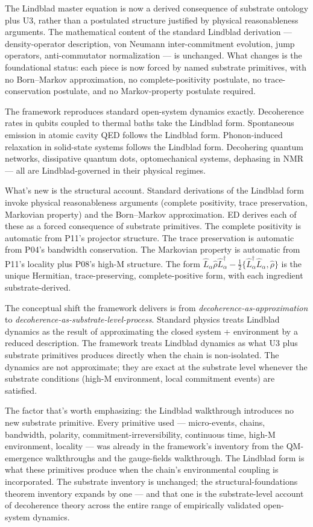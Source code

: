 \documentclass[11pt,a4paper]{article}
\begin{document}
The Lindblad master equation is now a derived consequence of substrate ontology plus U3, rather than a postulated structure justified by physical reasonableness arguments. The mathematical content of the standard Lindblad derivation --- density-operator description, von Neumann inter-commitment evolution, jump operators, anti-commutator normalization --- is unchanged. What changes is the foundational status: each piece is now forced by named substrate primitives, with no Born--Markov approximation, no complete-positivity postulate, no trace-conservation postulate, and no Markov-property postulate required.

The framework reproduces standard open-system dynamics exactly. Decoherence rates in qubits coupled to thermal baths take the Lindblad form. Spontaneous emission in atomic cavity QED follows the Lindblad form. Phonon-induced relaxation in solid-state systems follows the Lindblad form. Decohering quantum networks, dissipative quantum dots, optomechanical systems, dephasing in NMR --- all are Lindblad-governed in their physical regimes.

What's new is the structural account. Standard derivations of the Lindblad form invoke physical reasonableness arguments (complete positivity, trace preservation, Markovian property) and the Born--Markov approximation. ED derives each of these as a forced consequence of substrate primitives. The complete positivity is automatic from P11's projector structure. The trace preservation is automatic from P04's bandwidth conservation. The Markovian property is automatic from P11's locality plus P08's high-M structure. The form $\hat L_\alpha\hat\rho\hat L_\alpha^\dagger - \tfrac{1}{2}\{\hat L_\alpha^\dagger\hat L_\alpha, \hat\rho\}$ is the unique Hermitian, trace-preserving, complete-positive form, with each ingredient substrate-derived.

The conceptual shift the framework delivers is from \emph{decoherence-as-approximation} to \emph{decoherence-as-substrate-level-process}. Standard physics treats Lindblad dynamics as the result of approximating the closed system + environment by a reduced description. The framework treats Lindblad dynamics as what U3 plus substrate primitives produces directly when the chain is non-isolated. The dynamics are not approximate; they are exact at the substrate level whenever the substrate conditions (high-M environment, local commitment events) are satisfied.

The factor that's worth emphasizing: the Lindblad walkthrough introduces no new substrate primitive. Every primitive used --- micro-events, chains, bandwidth, polarity, commitment-irreversibility, continuous time, high-M environment, locality --- was already in the framework's inventory from the QM-emergence walkthroughs and the gauge-fields walkthrough. The Lindblad form is what these primitives produce when the chain's environmental coupling is incorporated. The substrate inventory is unchanged; the structural-foundations theorem inventory expands by one --- and that one is the substrate-level account of decoherence theory across the entire range of empirically validated open-system dynamics.
\end{document}

